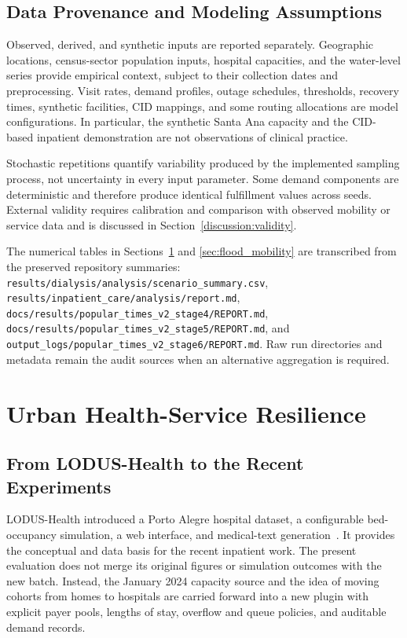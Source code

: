 \documentclass[pdflatex,sn-mathphys-num]{sn-jnl}%
\theoremstyle{thmstyleone}%
\theoremstyle{thmstyletwo}%
\theoremstyle{thmstylethree}%
\begin{document}
\subsection{Data Provenance and Modeling Assumptions}

Observed, derived, and synthetic inputs are reported separately. Geographic locations, census-sector population inputs, hospital capacities, and the water-level series provide empirical context, subject to their collection dates and preprocessing. Visit rates, demand profiles, outage schedules, thresholds, recovery times, synthetic facilities, CID mappings, and some routing allocations are model configurations. In particular, the synthetic Santa Ana capacity and the CID-based inpatient demonstration are not observations of clinical practice.

Stochastic repetitions quantify variability produced by the implemented sampling process, not uncertainty in every input parameter. Some demand components are deterministic and therefore produce identical fulfillment values across seeds. External validity requires calibration and comparison with observed mobility or service data and is discussed in Section~\ref{discussion:validity}.

The numerical tables in Sections~\ref{sec:health_resilience} and \ref{sec:flood_mobility} are transcribed from the preserved repository summaries: \texttt{results/dialysis/analysis/scenario\_summary.csv}, \texttt{results/inpatient\_care/analysis/report.md}, \texttt{docs/results/popular\_times\_v2\_stage4/REPORT.md}, \texttt{docs/results/popular\_times\_v2\_stage5/REPORT.md}, and \texttt{output\_logs/popular\_times\_v2\_stage6/REPORT.md}. Raw run directories and metadata remain the audit sources when an alternative aggregation is required.

\section{Urban Health-Service Resilience}
\label{sec:health_resilience}

\subsection{From LODUS-Health to the Recent Experiments}

LODUS-Health introduced a Porto Alegre hospital dataset, a configurable bed-occupancy simulation, a web interface, and medical-text generation~\citep{souza2026lodushealth}. It provides the conceptual and data basis for the recent inpatient work. The present evaluation does not merge its original figures or simulation outcomes with the new batch. Instead, the January 2024 capacity source and the idea of moving cohorts from homes to hospitals are carried forward into a new plugin with explicit payer pools, lengths of stay, overflow and queue policies, and auditable demand records.
\end{document}
